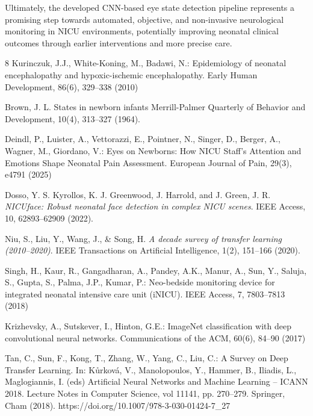 \documentclass[runningheads]{llncs}
\begin{document}
Ultimately, the developed CNN-based eye state detection pipeline represents a promising step towards automated, objective, and non-invasive neurological monitoring in NICU environments, potentially improving neonatal clinical outcomes through earlier interventions and more precise care.
%
%
% 
% 
%
\begin{thebibliography}{8}
Kurinczuk, J.J., White-Koning, M., Badawi, N.: Epidemiology of neonatal encephalopathy and hypoxic-ischemic encephalopathy. Early Human Development, 86(6), 329--338 (2010)

Brown, J. L. States in newborn infants
Merrill-Palmer Quarterly of Behavior and Development, 10(4), 313--327 (1964).

Deindl, P., Luister, A., Vettorazzi, E., Pointner, N., Singer, D., Berger, A., Wagner, M., Giordano, V.: Eyes on Newborns: How NICU Staff's Attention and Emotions Shape Neonatal Pain Assessment. European Journal of Pain, 29(3), e4791 (2025)

Dosso, Y. S. Kyrollos, K. J. Greenwood, J. Harrold, and J. Green, J. R.
\textit{NICUface: Robust neonatal face detection in complex NICU scenes}.
IEEE Access, 10, 62893--62909 (2022).

Niu, S., Liu, Y., Wang, J., \& Song, H.
\textit{A decade survey of transfer learning (2010--2020)}.
IEEE Transactions on Artificial Intelligence, 1(2), 151--166 (2020).

Singh, H., Kaur, R., Gangadharan, A., Pandey, A.K., Manur, A., Sun, Y., Saluja, S., Gupta, S., Palma, J.P., Kumar, P.: Neo-bedside monitoring device for integrated neonatal intensive care unit (iNICU). IEEE Access, 7, 7803–7813 (2018)

Krizhevsky, A., Sutskever, I., Hinton, G.E.: ImageNet classification with deep convolutional neural networks. Communications of the ACM, 60(6), 84–90 (2017)

Tan, C., Sun, F., Kong, T., Zhang, W., Yang, C., Liu, C.: A Survey on Deep Transfer Learning. In: Kůrková, V., Manolopoulos, Y., Hammer, B., Iliadis, L., Maglogiannis, I. (eds) Artificial Neural Networks and Machine Learning – ICANN 2018. Lecture Notes in Computer Science, vol 11141, pp. 270–279. Springer, Cham (2018). https://doi.org/10.1007/978-3-030-01424-7\_27


\end{thebibliography}
\end{document}

